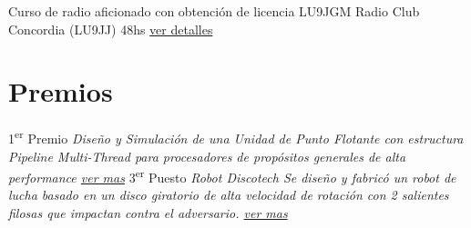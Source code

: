 \documentclass[11pt,a4paper,sans]{moderncv}  %
\begin{document}
 { Curso de radio aficionado con obtención de licencia LU9JGM                       } { Radio Club Concordia (LU9JJ)              } { 48hs                                                               } { \href                                                                                           { http://disenioconingenio.com.ar/producto.php?products_id=388                            }                         { ver detalles    }  } { } { }
\section{Premios}
                {1\textsuperscript{er} Premio} {}{}{\em{Diseño y Simulación de una Unidad de Punto Flotante con estructura Pipeline Multi-Thread para procesadores de propósitos generales de alta performance} \em \href{http://disenioconingenio.com.ar/shop/docs/i+d_itba_2002.pdf}{ver mas}}
  {3\textsuperscript{er} Puesto} {}{}{\em{Robot Discotech} \newline \em{Se diseño y fabricó un robot de lucha basado en un disco giratorio de alta velocidad de rotación con 2 salientes filosas que impactan contra el adversario. \href{http://disenioconingenio.com.ar/producto.php?products_id=378}{ver mas}}}
\end{document}
